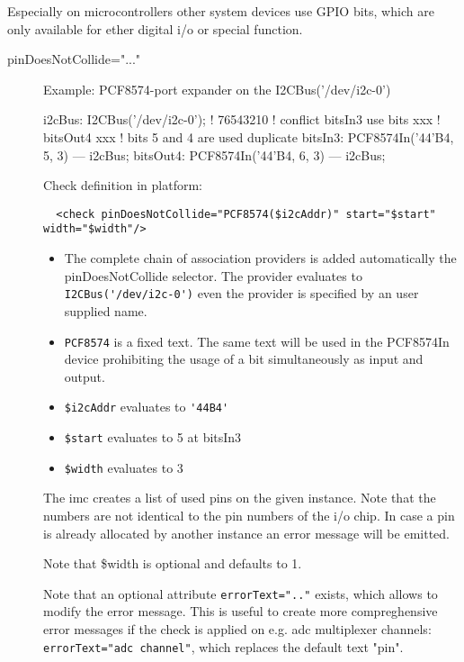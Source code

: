Especially on microcontrollers other system devices use GPIO bits, which 
are only available for ether digital i/o or special function.

\begin{description}
\item[pinDoesNotCollide="..."]

Example: PCF8574-port expander on the I2CBus('/dev/i2c-0')
  \begin{PEARLCode}
  i2cBus: I2CBus('/dev/i2c-0');
  !                             76543210
  ! conflict bitsIn3 use bits     xxx
  !          bitsOut4            xxx
  ! bits 5 and 4 are used duplicate 
  bitsIn3:  PCF8574In('44'B4, 5, 3) --- i2cBus;
  bitsOut4: PCF8574In('44'B4, 6, 3) --- i2cBus;
  \end{PEARLCode}

  Check definition in platform:
  \begin{verbatim}
  <check pinDoesNotCollide="PCF8574($i2cAddr)" start="$start" width="$width"/>  
  \end{verbatim}
  \begin{itemize}
  \item The complete chain of association providers is added automatically
  the pinDoesNotCollide selector. 
  The provider evaluates to \verb|I2CBus('/dev/i2c-0')| even
  the provider is specified by an user supplied name.

  \item \verb|PCF8574| is a fixed text. The same text will be used in the PCF8574In
  device prohibiting the usage of a bit simultaneously as input and output.

  \item \verb|$i2cAddr| evaluates to \verb|'44B4'|

  \item \verb|$start| evaluates to  5 at bitsIn3 

  \item \verb|$width| evaluates to 3

  \end{itemize}

The imc creates a list of used pins on the given instance. 
Note that the numbers are not identical to the pin numbers of
the i/o chip. 
In case a pin is already allocated by another instance an error
message will be emitted.

Note that \$width is optional and defaults to 1.

Note that an optional attribute \verb|errorText=".."| exists, which allows 
to modify the error message. This is useful to create more compreghensive 
error messages if the check is applied on e.g. adc multiplexer channels:
 \texttt{errorText="adc channel"}, which replaces the default text "pin".


\end{description}
